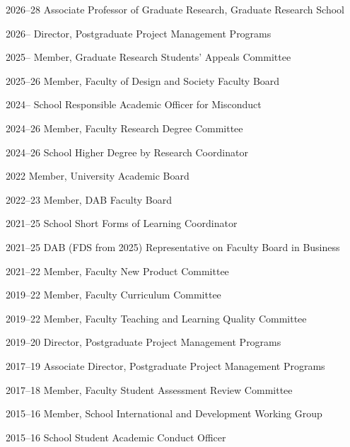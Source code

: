 \documentclass[11pt,a4paper]{report} %
\begin{document}
    \begin{tablist}
        
        \item[2026--28] \tab{}Associate Professor of Graduate Research, Graduate Research School
        
        \item[2026--] \tab{}Director, Postgraduate Project Management Programs

        \item[2025--] \tab{}Member, Graduate Research Students' Appeals Committee

        \item[2025--26] \tab{}Member, Faculty of Design and Society Faculty Board        
        
        \item[2024--] \tab{}School Responsible Academic Officer for Misconduct
        
        \item[2024--26] \tab{}Member, Faculty Research Degree Committee
        
        \item[2024--26] \tab{}School Higher Degree by Research Coordinator
        
        \item[2022] \tab{}Member, University Academic Board
        
        \item[2022--23] \tab{}Member, DAB Faculty Board
        
        \item[2021--25] \tab{}School Short Forms of Learning Coordinator
        
        \item[2021--25] \tab{}DAB (FDS from 2025) Representative on Faculty Board in Business
        
        \item[2021--22] \tab{}Member, Faculty New Product Committee
        
        \item[2019--22] \tab{}Member, Faculty Curriculum Committee
        
        \item[2019--22] \tab{}Member, Faculty Teaching and Learning Quality Committee
        
        \item[2019--20] \tab{}Director, Postgraduate Project Management Programs
        
        \item[2017--19] \tab{}Associate Director, Postgraduate Project Management Programs
        
        \item[2017--18] \tab{}Member, Faculty Student Assessment Review Committee
        
        \item[2015--16] \tab{}Member, School International and Development Working Group
        
        \item[2015--16] \tab{}School Student Academic Conduct Officer

    \end{tablist}
\end{document}
